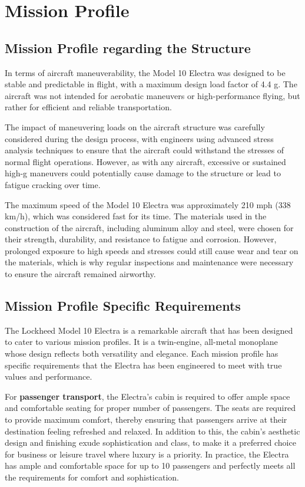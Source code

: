 \section{Mission Profile}
\subsection{Mission Profile regarding the Structure}
In terms of aircraft maneuverability, the Model 10 Electra was designed to be stable and predictable in flight, with a maximum design load factor of 4.4 g. The aircraft was not intended for aerobatic maneuvers or high-performance flying, but rather for efficient and reliable transportation.

The impact of maneuvering loads on the aircraft structure was carefully considered during the design process, with engineers using advanced stress analysis techniques to ensure that the aircraft could withstand the stresses of normal flight operations. However, as with any aircraft, excessive or sustained high-g maneuvers could potentially cause damage to the structure or lead to fatigue cracking over time.

The maximum speed of the Model 10 Electra was approximately 210 mph (338 km/h), which was considered fast for its time. The materials used in the construction of the aircraft, including aluminum alloy and steel, were chosen for their strength, durability, and resistance to fatigue and corrosion. However, prolonged exposure to high speeds and stresses could still cause wear and tear on the materials, which is why regular inspections and maintenance were necessary to ensure the aircraft remained airworthy.

\subsection{Mission Profile Specific Requirements}

The Lockheed Model 10 Electra is a remarkable aircraft that has been designed to cater to various mission profiles. It is a twin-engine, all-metal monoplane whose design reflects both versatility and elegance. Each mission profile has specific requirements that the Electra has been engineered to meet with true values and performance.

For \textbf{passenger transport}, the Electra's cabin is required to offer ample space and comfortable seating for proper number of passengers. The seats are required to provide maximum comfort, thereby ensuring that passengers arrive at their destination feeling refreshed and relaxed. In addition to this, the cabin's aesthetic design and finishing exude sophistication and class, to make it a preferred choice for business or leisure travel where luxury is a priority.
In practice, the Electra has ample and comfortable space for up to 10 passengers and perfectly meets all the requirements for comfort and sophistication.

